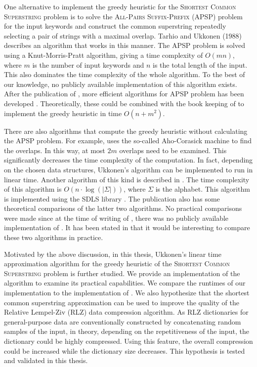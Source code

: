 \documentclass[english,twoside,censored,csm,algorithms-track-2020]{HYthesisML}
\theoremstyle{plain}
\theoremstyle{definition}
\numberwithin{testexample}{chapter}
\begin{document}
One alternative to implement the greedy heuristic for the \textsc{Shortest Common Superstring}
problem is to solve the 
\textsc{All-Pairs Suffix-Prefix} (APSP) problem \citep{Lim17} for the input keywords and construct the
common superstring repeatedly selecting a pair of strings with a maximal overlap.
Tarhio and Ukkonen (1988) describes an algorithm that works in this manner. The APSP problem is solved
using a Knut-Morris-Pratt algorithm, giving a time complexity of $O(mn)$, where $m$ is the
number of input keywords and $n$ is the total length of the input. This also dominates the time
complexity of the whole algorithm. To the best of our knowledge, no publicly available
implementation of this algorithm exists. After the publication of \citep{Tarhio88}, more efficient
algorithms for APSP problem has been developed \citep{Gusfield92}. Theoretically, these could be
combined with the book keeping of \citep{Tarhio88} to implement the greedy heuristic in time
$O(n+m^2)$.

There are also algorithms that compute the greedy heuristic without calculating the APSP problem.
For example, \citep{Ukkonen90} uses the so-called Aho-Corasick machine to find the overlaps. In this way,
at most $2m$ overlaps need to be examined. This significantly decreases the time complexity of
the computation. In fact, depending on the chosen data structures, Ukkonen's algorithm can be implemented
to run in linear time.
Another algorithm of this kind is described in \citep{Alanko17}.
The time complexity of this
algorithm is $O(n\cdot\log(|\Sigma|))$, where $\Sigma$ is the alphabet.
This algorithm is implemented using the SDLS library  \citep{SDLS}. The publication also has some
theoretical comparisons of the latter two algorithms. No practical comparisons were made since at the
time of writing of \citep{Alanko17}, there was no publicly available implementation of
\citep{Ukkonen90}. It has been stated in \citep{Alanko17} that
it would be interesting to compare these two algorithms in practice.

Motivated by the above discussion, in this thesis, Ukkonen's linear time approximation algorithm
for the greedy heuristic of the \textsc{Shortest Common Superstring} problem is further studied.
We provide an implementation of the algorithm to examine its practical capabilities.
We compare the runtimes of our implementation to the implementation of \citep{Alanko17}.
We also hypothesize that the shortest common superstring approximation can be used to
improve the quality of the Relative Lempel-Ziv (RLZ) data compression algorithm. As RLZ dictionaries
for general-purpose data are conventionally
constructed by concatenating random samples of the input, in theory,
depending on the repetitiveness of the input, the dictionary could be highly compressed.
Using this feature, the overall compression could be increased while the dictionary size
decreases. This hypothesis is tested and validated in this thesis. 
\end{document}
